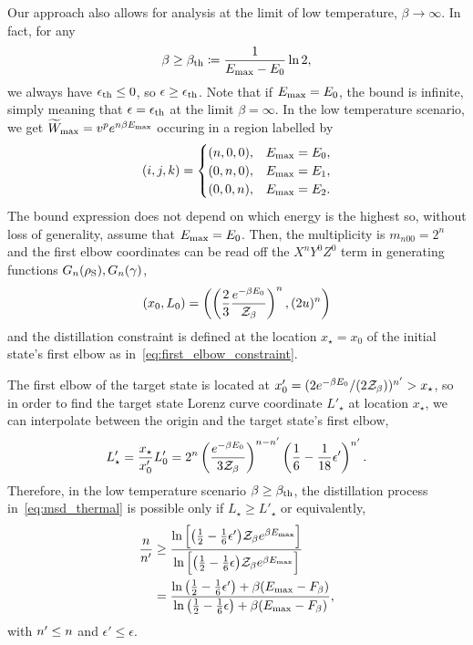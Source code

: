 \documentclass[pra,
aps,
twocolumn,
superscriptaddress,
groupedaddress,
nofootinbib,
reprint
]{revtex4-1}
\begin{document}
Our approach also allows for analysis at the limit of low temperature, $\beta \rightarrow \infty$.
In fact, for any
\begin{equation}
	\beta \geq \beta_{\rm{th}} \coloneqq \frac{1}{E_{\rm{max}} - E_0} \ln2,
\end{equation}
we always have $\epsilon_{\rm{th}} \leq 0$, so $\epsilon \geq \epsilon_{\rm{th}}$.
Note that if $E_{\rm{max}} = E_0$, the bound is infinite, simply meaning that $\epsilon = \epsilon_{\rm{th}}$ at the limit $\beta = \infty$.
In the low temperature scenario, we get $\widetilde{W}_{\rm{max}} = \wn^p e^{n\beta E_{\rm{max}}}$ occuring in a region labelled by 
\begin{equation}
	(i,j,k) = 
	\begin{cases}
	(n,0,0), &E_{\rm{max}} = E_0, \\
	(0,n,0), &E_{\rm{max}} = E_1, \\
	(0,0,n), &E_{\rm{max}} = E_2.
	\end{cases}
\end{equation}
The bound expression does not depend on which energy is the highest so, without loss of generality, assume that $E_{\rm{max}} = E_0$.
Then, the multiplicity is $m_{n00} = 2^n$ and the first elbow coordinates can be read off the $X^nY^0Z^0$ term in generating functions $G_n(\noisys), G_n(\gamma)$,
\begin{equation}
	(x_0, L_0) = \left( \left(\frac{2}{3}\frac{e^{-\beta E_0}}{\Z_\beta}\right)^n, (2u)^n \right)
\end{equation}
and the distillation constraint is defined at the location $x_\star = x_0$ of the initial state's first elbow as in~\cref{eq:first_elbow_constraint}.

The first elbow of the target state is located at $x'_0 = (2e^{-\beta E_0} / (2\Z_\beta))^{\tt} > x_\star$, so in order to find the target state Lorenz curve coordinate $L'_\star$ at location $x_\star$, we can interpolate between the origin and the target state's first elbow, 
\begin{equation}\label{eq:constraint_deriv_lowtemp}
	L'_\star = \frac{x_\star}{x'_0}L'_0 = 2^n \left(\frac{e^{-\beta E_0}}{3\Z_\beta}\right)^{n-\tt} \left( \frac{1}{6} - \frac{1}{18}\epsilon' \right)^{\tt}.
\end{equation}
Therefore, in the low temperature scenario $\beta \geq \beta_{\rm{th}}$, the distillation process in~\cref{eq:msd_thermal} is possible only if $L_\star \geq L'_\star$ or equivalently,
\begin{align}
	\frac{n}{n'} &\geq \frac{\ln{\Big[ \big( \frac{1}{2}-\frac{1}{6}\epsilon' \big)\Z_\beta e^{\beta E_{\rm{max}}} \Big]}}{\ln{\Big[ \big( \frac{1}{2}-\frac{1}{6}\epsilon \big)\Z_\beta e^{\beta E_{\rm{max}}} \Big]}} \nonumber\\
	&= \frac{\ln{\big( \frac{1}{2}-\frac{1}{6}\epsilon' \big)} + \beta (E_{\rm{max}} - F_\beta)}{\ln{\big( \frac{1}{2}-\frac{1}{6}\epsilon \big)} + \beta (E_{\rm{max}} - F_\beta)},
\end{align}
with $\tt \leq n$ and $\epsilon' \leq \epsilon$.
\end{document}
